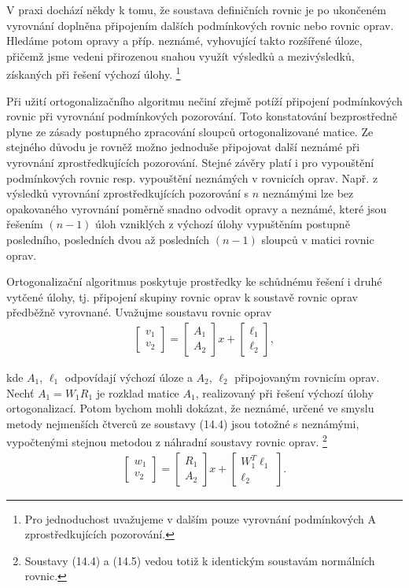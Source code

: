 V praxi dochází někdy k tomu, že soustava definičních rovnic je po
ukončeném vyrovnání doplněna připojením dalších podmínkových rovnic
nebo rovnic oprav. Hledáme potom opravy a příp.  neznámé, vyhovující
takto rozšířené úloze, přičemž jsme vedeni přirozenou snahou využít
výsledků a mezivýsledků, získaných při řešení výchozí úlohy.%
\footnote{Pro jednoduchost uvažujeme v dalším pouze vyrovnání
	  podmínkových A zprostředkujících pozorování.}

Při užití ortogonalizačního algoritmu nečiní zřejmě potíží připojení
podmínkových rovnic při vyrovnání podmínkových pozorování. Toto
konstatování bezprostředně plyne ze zásady postupného zpracování
sloupců ortogonalizované matice. Ze stejného důvodu je rovněž možno
jednoduše připojovat další neznámé při vyrovnání zprostředkujících
pozorování. Stejné závěry platí i pro vypouštění podmínkových rovnic
resp. vypouštění neznámých v rovnicích oprav. Např. z výsledků
vyrovnání zprostředkujících pozorování s $n$ neznámými lze bez
opakovaného vyrovnání poměrně snadno odvodit opravy a neznámé, které
jsou řešením $(n-1)$ úloh vzniklých z výchozí úlohy vypuštěním
postupně posledního, posledních dvou až posledních $(n-1)$ sloupců v
matici rovnic oprav.

Ortogonalizační algoritmus poskytuje prostředky ke schůdnému
řešení i druhé vytčené úlohy, tj. připojení skupiny rovnic oprav
k soustavě rovnic oprav předběžně vyrovnané. Uvažujme
 soustavu rovnic oprav
%
\begin{align*}
\tag{14.4}
\left[\begin{array}{c} v_1 \\ v_2 \end{array}\right] =
\left[\begin{array}{c} A_1 \\ A_2 \end{array}\right] x +
\left[\begin{array}{c} \ell_1 \\ \ell_2 \end{array}\right] ,
\end{align*}

\noindent
kde $A_1$, $\ell_1$ odpovídají výchozí úloze a $A_2$, $\ell_2$ připojovaným
rovnicím oprav. Nechť $A_1 = W_1 R_1$ je rozklad matice $A_1$,
realizovaný při řešení výchozí úlohy ortogonalizací. Potom bychom mohli
dokázat, že neznámé, určené ve smyslu metody nejmenších čtverců
ze soustavy (14.4) jsou totožné s neznámými, vypočtenými stejnou
metodou z náhradní soustavy rovnic oprav.%
\footnote{Soustavy (14.4) a (14.5) vedou totiž k identickým soustavám
normálních rovnic.}
%
\begin{align*}
\tag{14.5}
\left[\begin{array}{c} w_1 \\ v_2 \end{array}\right] =
\left[\begin{array}{c} R_1 \\ A_2 \end{array}\right] x +
\left[\begin{array}{c} W^T_1\ell_1 \\ \ell_2 \end{array}\right] .
\end{align*}


